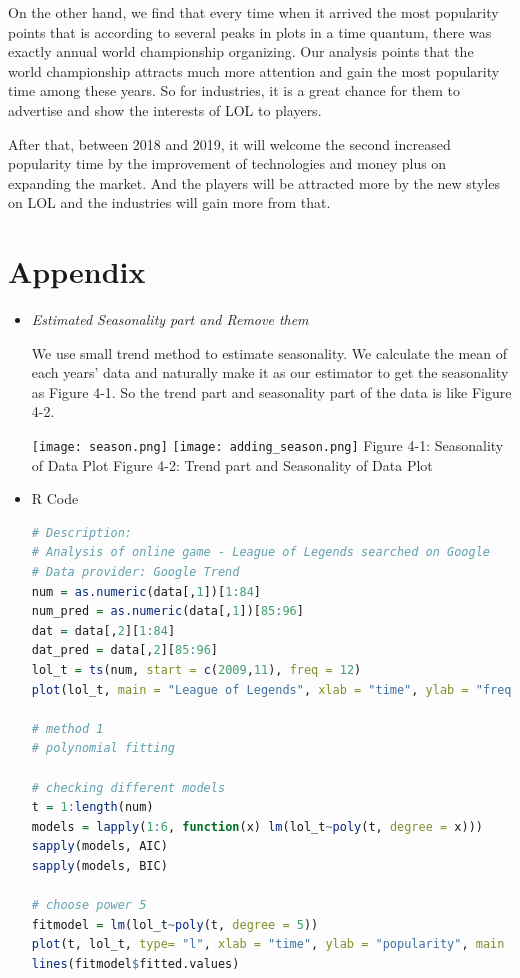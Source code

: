 \documentclass[11pt,a4paper]{article}
\begin{document}
On the other hand, we find that every time when it arrived the most popularity points that is according to several peaks in plots in a time quantum, there was exactly annual world championship organizing. Our analysis points that the world championship attracts much more attention and gain the most popularity time among these years. So for industries, it is a great chance for them to advertise and show the interests of LOL to players.

After that, between 2018 and 2019,  it will welcome the second increased popularity time by the improvement of technologies and money plus on expanding the market. And the players will be attracted more by the new styles on LOL and the industries will gain more from that. 

\newpage
\section*{Appendix}\begin{itemize}
\item\textit{Estimated Seasonality part and Remove them}

We use small trend method to estimate seasonality. We calculate the mean of each years' data and naturally make it as our estimator to get the seasonality as Figure 4-1. So the trend part and seasonality part of the data is like Figure 4-2.

\texttt{[image: season.png]}
\texttt{[image: adding\_season.png]}   {Figure 4-1: Seasonality of  Data Plot}\hspace{2cm} {Figure 4-2: Trend part and Seasonality of Data Plot}    


\item
{R Code}
\begin{lstlisting}[language=R]
# Description:
# Analysis of online game - League of Legends searched on Google
# Data provider: Google Trend
num = as.numeric(data[,1])[1:84]
num_pred = as.numeric(data[,1])[85:96]
dat = data[,2][1:84]
dat_pred = data[,2][85:96]
lol_t = ts(num, start = c(2009,11), freq = 12)
plot(lol_t, main = "League of Legends", xlab = "time", ylab = "frequnce")

# method 1
# polynomial fitting

# checking different models
t = 1:length(num)
models = lapply(1:6, function(x) lm(lol_t~poly(t, degree = x)))
sapply(models, AIC)
sapply(models, BIC)

# choose power 5
fitmodel = lm(lol_t~poly(t, degree = 5))
plot(t, lol_t, type= "l", xlab = "time", ylab = "popularity", main = "original plot with power 5 polynormial fitting line")
lines(fitmodel$fitted.values)


\end{lstlisting}
\end{itemize}
\end{document}
